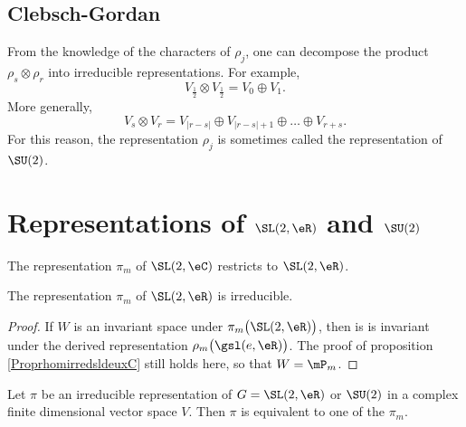 \subsection{Clebsch-Gordan}

From the knowledge of the characters of $\rho_j$, one can decompose the product $\rho_s\otimes\rho_r$ into irreducible representations. For example,
\[
   V_{\frac{1}{2}}\otimes V_{\frac{1}{2}}=V_0\oplus V_1.  
\]
More generally,
\begin{equation}
  V_s\otimes V_r=V_{|r-s|} \oplus V_{|r-s|+1}\oplus\ldots\oplus V_{r+s}.
\end{equation}
For this reason, the representation $\rho_j$ is sometimes called the  representation of $\SU(2)$.

					\section{Representations of \texorpdfstring{$\SL(2,\eR)$}{SL2R} and \texorpdfstring{$\SU(2)$}{SU2}}

The representation $\pi_m$ of $\SL(2,\eC)$ restricts to $\SL(2,\eR)$.

\begin{lemma}
The representation $\pi_m$ of $\SL(2,\eR)$ is irreducible.
\end{lemma}

\begin{proof}
If $W$ is an invariant space under $\pi_m\big( \SL(2,\eR) \big)$, then is is invariant under the derived representation $\rho_m\big( \gsl(e,\eR) \big)$. The proof of proposition \ref{ProprhomirredsldeuxC} still holds here, so that $W=\mP_m$.
\end{proof}

\begin{theorem}
Let $\pi$ be an irreducible representation of $G=\SL(2,\eR)$ or $\SU(2)$ in a complex finite dimensional vector space $V$. Then $\pi$ is equivalent to one of the $\pi_m$.
\end{theorem}

